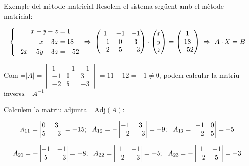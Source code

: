 \documentclass[11pt,a4paper]{article}
\newcommand{\fmm}[1]{\setbox0=\hbox{$#1$}\ifdim\wd0>\linewidth\fmdisp{#1}\else\mbox{\box0}\fi}
\newcommand{\fmdisp}[1]{\[\setbox2=\hbox{$\displaystyle #1$}\ifdim\wd2>\linewidth\resizebox{\linewidth}{!}{\box2}\else\box2\fi\]}
\begin{document}
\begin{fmex}{Exemple del mètode matricial}
Resolem el sistema següent amb el mètode matricial:

\fmdisp{\left\{\begin{aligned}x-y-z&=1\\ -x+3z&=18\\ -2x+5y-3z&=-52\end{aligned}\right.\ \Rightarrow\ \begin{pmatrix}1 & -1 & -1\\ -1 & 0 & 3\\ -2 & 5 & -3\end{pmatrix}\cdot\begin{pmatrix}x\\ y\\ z\end{pmatrix}=\begin{pmatrix}1\\ 18\\ -52\end{pmatrix}\ \Rightarrow\ A\cdot X=B}

Com \fmm{|A|=\begin{vmatrix}1 & -1 & -1\\ -1 & 0 & 3\\ -2 & 5 & -3\end{vmatrix}=11-12=-1\neq0}, podem calcular la matriu inversa \fmm{A^{-1}}.

Calculem la matriu adjunta \fmm{\mathrm{Adj}(A)}:

\fmdisp{A_{11}=\begin{vmatrix}0 & 3\\ 5 & -3\end{vmatrix}=-15;\ \ A_{12}=-\begin{vmatrix}-1 & 3\\ -2 & -3\end{vmatrix}=-9;\ \ A_{13}=\begin{vmatrix}-1 & 0\\ -2 & 5\end{vmatrix}=-5}

\fmdisp{A_{21}=-\begin{vmatrix}-1 & -1\\ 5 & -3\end{vmatrix}=-8;\ \ A_{22}=\begin{vmatrix}1 & -1\\ -2 & -3\end{vmatrix}=-5;\ \ A_{23}=-\begin{vmatrix}1 & -1\\ -2 & 5\end{vmatrix}=-3}


\end{fmex}
\end{document}
